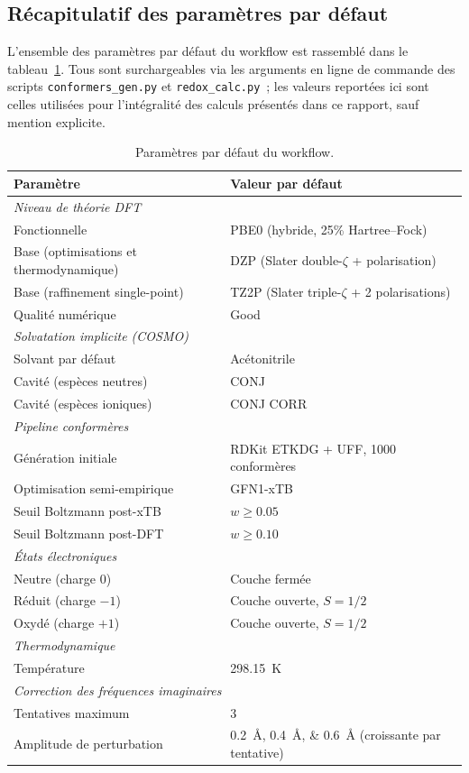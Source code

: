 \subsection{Récapitulatif des paramètres par défaut}

L'ensemble des paramètres par défaut du workflow est rassemblé dans le tableau~\ref{tab:params_default}. Tous sont surchargeables via les arguments en ligne de commande des scripts \texttt{conformers\_gen.py} et \texttt{redox\_calc.py}~; les valeurs reportées ici sont celles utilisées pour l'intégralité des calculs présentés dans ce rapport, sauf mention explicite.

\begin{table}[htbp]
\centering
\caption{Paramètres par défaut du workflow.}
\label{tab:params_default}
\begin{tabular}{ll}
\toprule
\textbf{Paramètre} & \textbf{Valeur par défaut} \\
\midrule
\multicolumn{2}{l}{\textit{Niveau de théorie DFT}} \\
Fonctionnelle & PBE0 (hybride, 25\% Hartree--Fock) \\
Base (optimisations et thermodynamique) & DZP (Slater double-$\zeta$ + polarisation) \\
Base (raffinement single-point) & TZ2P (Slater triple-$\zeta$ + 2 polarisations) \\
Qualité numérique & Good \\
\midrule
\multicolumn{2}{l}{\textit{Solvatation implicite (COSMO)}} \\
Solvant par défaut & Acétonitrile \\
Cavité (espèces neutres) & CONJ \\
Cavité (espèces ioniques) & CONJ CORR \\
\midrule
\multicolumn{2}{l}{\textit{Pipeline conformères}} \\
Génération initiale & RDKit ETKDG + UFF, 1000 conformères \\
Optimisation semi-empirique & GFN1-xTB \\
Seuil Boltzmann post-xTB & $w \geq 0.05$ \\
Seuil Boltzmann post-DFT & $w \geq 0.10$ \\
\midrule
\multicolumn{2}{l}{\textit{États électroniques}} \\
Neutre (charge $0$) & Couche fermée \\
Réduit (charge $-1$) & Couche ouverte, $S = 1/2$ \\
Oxydé (charge $+1$) & Couche ouverte, $S = 1/2$ \\
\midrule
\multicolumn{2}{l}{\textit{Thermodynamique}} \\
Température & \SI{298.15}{K} \\
\midrule
\multicolumn{2}{l}{\textit{Correction des fréquences imaginaires}} \\
Tentatives maximum & 3 \\
Amplitude de perturbation & \SIlist{0.2;0.4;0.6}{\angstrom} (croissante par tentative) \\
\bottomrule
\end{tabular}
\end{table}

